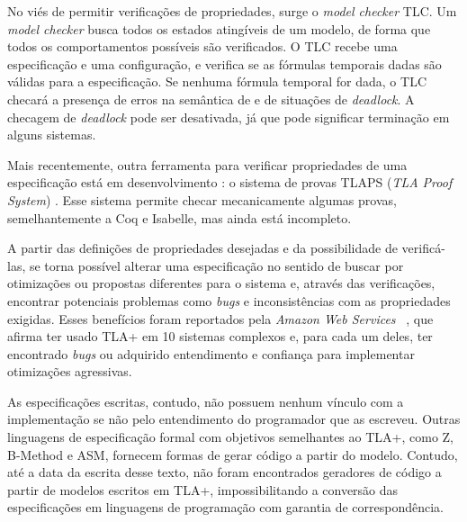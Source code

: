 No viés de permitir verificações de propriedades, surge o \textit{model checker} TLC. Um \textit{model checker} busca todos os estados atingíveis de um modelo, de forma que todos os comportamentos possíveis são verificados. O TLC recebe uma especificação e uma configuração, e verifica se as fórmulas temporais dadas são válidas para a especificação. Se nenhuma fórmula temporal for dada, o TLC checará a presença de erros na semântica de \TLA e de situações de \textit{deadlock}. A checagem de \textit{deadlock} pode ser desativada, já que pode significar terminação em alguns sistemas.

Mais recentemente, outra ferramenta para verificar propriedades de uma especificação está em desenvolvimento : o sistema de provas TLAPS (\textit{TLA Proof System}) \cite{tlaps2010}. Esse sistema permite checar mecanicamente algumas provas, semelhantemente a Coq e Isabelle, mas ainda está incompleto.

A partir das definições de propriedades desejadas e da possibilidade de verificá-las, se torna possível alterar uma especificação no sentido de buscar por otimizações ou propostas diferentes para o sistema e, através das verificações, encontrar potenciais problemas como \textit{bugs} e inconsistências com as propriedades exigidas. Esses benefícios foram reportados pela \textit{Amazon Web Services} ~\cite{amazon}, que afirma ter usado TLA+ em 10 sistemas complexos e, para cada um deles, ter encontrado \textit{bugs} ou adquirido entendimento e confiança para implementar otimizações agressivas.

As especificações escritas, contudo, não possuem nenhum vínculo com a implementação se não pelo entendimento do programador que as escreveu. Outras linguagens de especificação formal com objetivos semelhantes ao TLA+, como Z, B-Method e ASM, fornecem formas de gerar código a partir do modelo. Contudo, até a data da escrita desse texto, não foram encontrados geradores de código a partir de modelos escritos em TLA+, impossibilitando a conversão das especificações em linguagens de programação com garantia de correspondência.


